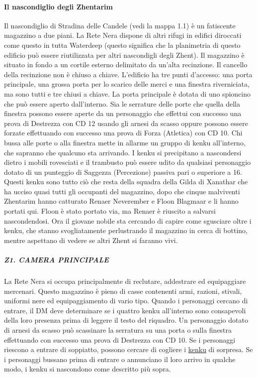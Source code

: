 \documentclass{article}
\begin{document}
                \paragraph{Il nascondiglio degli Zhentarim}
Il nascondiglio di Stradina delle Candele (vedi la mappa
1.1) è un fatiscente magazzino a due piani. La Rete Nera
dispone di altri rifugi in edifici diroccati come questo in
tutta Waterdeep (questo significa che la planimetria di
questo edificio può essere riutilizzata per altri nascondigli
degli Zhent).
Il magazzino è situato in fondo a un cortile esterno
delimitato da un’alta recinzione. Il cancello della recinzione
non è chiuso a chiave. L'edificio ha tre punti d'accesso:
una porta principale, una grossa porta per lo scarico delle
merci e una finestra riverniciata, ma sono tutti e tre chiusi
a chiave. La porta principale è dotata di uno spioncino
che può essere aperto dall'interno. Sia le serrature delle
porte che quella della finestra possono essere aperte da
un personaggio che effettui con successo una prova di
Destrezza con CD 12 usando gli arnesi da scasso oppure
possono essere forzate effettuando con successo una prova
di Forza (Atletica) con CD 10.
Chi bussa alle porte o alla finestra mette in allarme un
gruppo di kenku all'interno, che sapranno che qualcuno
sta arrivando. I kenku si precipitano a nascondersi
dietro i mobili rovesciati e il trambusto può essere
udito da qualsiasi personaggio dotato di un punteggio
di Saggezza (Percezione) passiva pari o superiore a 16.
Questi kenku sono tutto ciò che resta della squadra della
Gilda di Xanathar che ha ucciso quasi tutti gli occupanti
del magazzino, dopo che cinque malviventi Zhentarim
hanno catturato Renaer Neverember e Floon Blagmaar e
li hanno portati qui. Floon è stato portato via, ma Renaer
è riuscito a salvarsi nascondendosi. Ora il giovane nobile
sta cercando di capire come sgusciare oltre i kenku, che
stanno svogliatamente perlustrando il magazzino in cerca
di bottino, mentre aspettano di vedere se altri Zhent si
faranno vivi.


                        \subparagraph{Z1. CAMERA PRINCIPALE}La Rete Nera si occupa principalmente di reclutare,
addestrare ed equipaggiare mercenari. Questo magazzino
è pieno di casse contenenti armi, razioni, stivali, uniformi
nere ed equipaggiamento di vario tipo.
Quando i personaggi cercano di entrare, il DM
deve determinare se i quattro kenku all'interno sono
consapevoli della loro presenza prima di leggere il testo
del riquadro.
Un personaggio dotato di arnesi da scasso può
scassinare la serratura su una porta o sulla finestra
effettuando con successo una prova di Destrezza con
CD 10. Se i personaggi riescono a entrare di soppiatto,
possono cercare di cogliere i \hyperlink{kenk}{kenku} di sorpresa. Se i
personaggi bussano prima di entrare o annunciano il
loro arrivo in qualche modo, i kenku si nascondono come
descritto più sopra. \\
\end{document}
